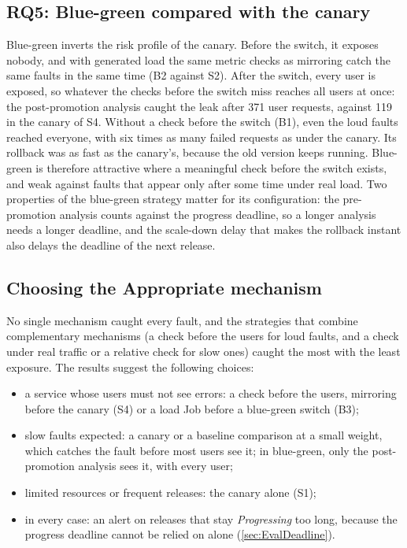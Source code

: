 \subsection{RQ5: Blue-green compared with the canary}
\label{sec:EvalRQ5}
Blue-green inverts the risk profile of the canary. Before the switch, it exposes nobody, and with generated load the same metric checks as mirroring catch the same faults in the same time (B2 against S2). After the switch, every user is exposed, so whatever the checks before the switch miss reaches all users at once: the post-promotion analysis caught the leak after 371 user requests, against 119 in the canary of S4. Without a check before the switch (B1), even the loud faults reached everyone, with six times as many failed requests as under the canary. Its rollback was as fast as the canary's, because the old version keeps running. Blue-green is therefore attractive where a meaningful check before the switch exists, and weak against faults that appear only after some time under real load. Two properties of the blue-green strategy matter for its configuration: the pre-promotion analysis counts against the progress deadline, so a longer analysis needs a longer deadline, and the scale-down delay that makes the rollback instant also delays the deadline of the next release.

\subsection{Choosing the Appropriate mechanism}
\label{sec:EvalDecisionGuide}
No single mechanism caught every fault, and the strategies that combine complementary mechanisms (a check before the users for loud faults, and a check under real traffic or a relative check for slow ones) caught the most with the least exposure. The results suggest the following choices:
\begin{itemize}
	\item a service whose users must not see errors: a check before the users, mirroring before the canary (S4) or a load Job before a blue-green switch (B3);
	\item slow faults expected: a canary or a baseline comparison at a small weight, which catches the fault before most users see it; in blue-green, only the post-promotion analysis sees it, with every user;
	\item limited resources or frequent releases: the canary alone (S1);
	\item in every case: an alert on releases that stay \emph{Progressing} too long, because the progress deadline cannot be relied on alone (\autoref{sec:EvalDeadline}).
\end{itemize}

